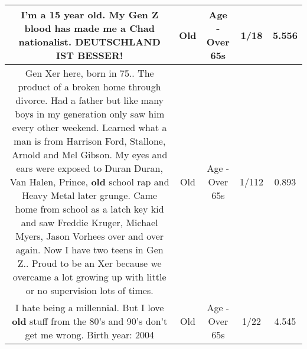\documentclass[11pt]{article}
\newlength\mylength
\begin{document}
\begin{center}
\begin{longtable}{|C{.65\mylength}|C{.30\mylength}|C{.12\mylength}|C{.12\mylength}|C{.12\mylength}|}
  \small I'm a 15 year \textbf{old}. My Gen Z blood has made me a Chad nationalist. DEUTSCHLAND IST BESSER!\normalsize   & Old & Age - Over 65s & 1/18 & 5.556 \\  \hline
  \small Gen Xer here, born in 75.. The product of a broken home through divorce. Had a father but like many boys in my generation only saw him every other weekend. Learned what a man is from Harrison Ford, Stallone, Arnold and Mel Gibson. My eyes and ears were exposed to Duran Duran, Van Halen, Prince, \textbf{old} school rap and Heavy Metal later grunge. Came home from school as a latch key kid and saw Freddie Kruger, Michael Myers, Jason Vorhees over and over again. Now I have two teens in Gen Z.. Proud to be an Xer because we overcame a lot growing up with little or no supervision lots of times.\normalsize   & Old & Age - Over 65s & 1/112 & 0.893 \\  \hline
  \small I hate being a millennial. But I love \textbf{old} stuff from the 80's and 90's don't get me wrong.   Birth year: 2004\normalsize   & Old & Age - Over 65s & 1/22 & 4.545 \\  \hline

\end{longtable}
\end{center}
\end{document}
